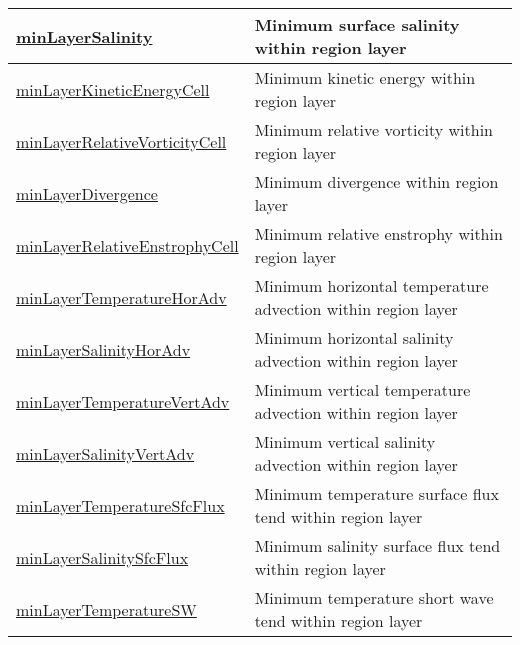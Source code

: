 {\begin{center}
\begin{longtable}{| p{2.0in} | p{4.0in} |}
    \hline
    \hyperref[subsec:var_sec_layerVolumeWeightedAverageAM_minLayerSalinity]{minLayerSalinity} & Minimum surface salinity within region layer \\
    \hline
    \hyperref[subsec:var_sec_layerVolumeWeightedAverageAM_minLayerKineticEnergyCell]{minLayerKineticEnergyCell} & Minimum kinetic energy within region layer \\
    \hline
    \hyperref[subsec:var_sec_layerVolumeWeightedAverageAM_minLayerRelativeVorticityCell]{minLayerRelativeVorticityCell} & Minimum relative vorticity within region layer \\
    \hline
    \hyperref[subsec:var_sec_layerVolumeWeightedAverageAM_minLayerDivergence]{minLayerDivergence} & Minimum divergence within region layer \\
    \hline
    \hyperref[subsec:var_sec_layerVolumeWeightedAverageAM_minLayerRelativeEnstrophyCell]{minLayerRelativeEnstrophyCell} & Minimum relative enstrophy within region layer \\
    \hline
    \hyperref[subsec:var_sec_layerVolumeWeightedAverageAM_minLayerTemperatureHorAdv]{minLayerTemperatureHorAdv} & Minimum horizontal temperature advection within region layer \\
    \hline
    \hyperref[subsec:var_sec_layerVolumeWeightedAverageAM_minLayerSalinityHorAdv]{minLayerSalinityHorAdv} & Minimum horizontal salinity advection within region layer \\
    \hline
    \hyperref[subsec:var_sec_layerVolumeWeightedAverageAM_minLayerTemperatureVertAdv]{minLayerTemperatureVertAdv} & Minimum vertical temperature advection within region layer \\
    \hline
    \hyperref[subsec:var_sec_layerVolumeWeightedAverageAM_minLayerSalinityVertAdv]{minLayerSalinityVertAdv} & Minimum vertical salinity advection within region layer \\
    \hline
    \hyperref[subsec:var_sec_layerVolumeWeightedAverageAM_minLayerTemperatureSfcFlux]{minLayerTemperatureSfcFlux} & Minimum temperature surface flux tend within region layer \\
    \hline
    \hyperref[subsec:var_sec_layerVolumeWeightedAverageAM_minLayerSalinitySfcFlux]{minLayerSalinitySfcFlux} & Minimum salinity surface flux tend within region layer \\
    \hline
    \hyperref[subsec:var_sec_layerVolumeWeightedAverageAM_minLayerTemperatureSW]{minLayerTemperatureSW} & Minimum temperature short wave tend within region layer \\

\end{longtable}
\end{center}}
